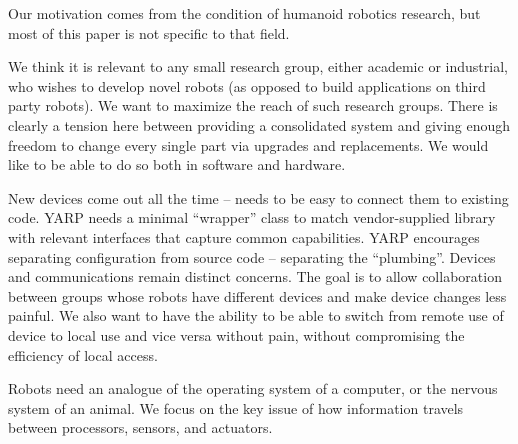Our motivation comes from the condition of humanoid robotics 
research, but most of this paper is not specific to that field.

%
We think it is relevant to any small research group, either academic or
industrial, who wishes to develop novel robots (as opposed to 
build applications on third party robots).  We want to maximize the 
reach of such research groups. There is clearly a tension here 
between providing a consolidated system and giving enough freedom
to change every single part via upgrades and replacements. We would
like to be able to do so both in software and hardware.










New devices come out all the time -- needs to be easy to connect them
to existing code.  YARP needs a minimal ``wrapper'' class to match
vendor-supplied library with relevant interfaces that capture common
capabilities.  YARP encourages separating configuration from source
code -- separating the ``plumbing''.  Devices and communications
remain distinct concerns.  The goal is to allow collaboration between
groups whose robots have different devices and make device changes
less painful.  We also want to have the ability to be able to switch
from remote use of device to local use and vice versa without pain,
without compromising the efficiency of local access.

Robots need an analogue of the operating system of a computer, or the
nervous system of an animal.  We focus on the key issue of how information
travels between processors, sensors, and actuators.
